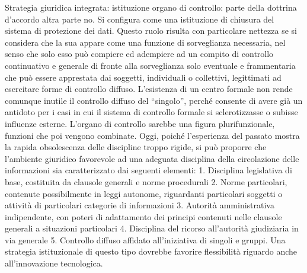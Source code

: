 Strategia giuridica integrata:
istituzione organo di controllo: parte della dottrina d’accordo altra parte no. Si configura come una istituzione di chiusura del sistema di protezione dei dati. Questo ruolo risulta con particolare nettezza se si considera che la sua appare come una funzione di sorveglianza necessaria, nel senso che solo esso può compiere ed adempiere ad un compito di controllo continuativo e generale di fronte alla sorveglianza solo eventuale e frammentaria che può essere apprestata dai soggetti, individuali o collettivi, legittimati ad esercitare forme di controllo diffuso. L’esistenza di un centro formale non rende comunque inutile il controllo diffuso del “singolo”, perché consente di avere già un antidoto per i casi in cui il sistema di controllo formale si sclerotizzasse o subisse influenze esterne. L’organo di controllo sarebbe una figura plurifunzionale, funzioni che poi vengono combinate.
Oggi, poiché l’esperienza del passato mostra la rapida obsolescenza delle discipline troppo rigide, si può proporre che l’ambiente giuridico favorevole ad una adeguata disciplina della circolazione delle informazioni sia caratterizzato dai seguenti elementi:
1.	Disciplina legislativa di base, costituita da clausole generali e norme procedurali
2.	Norme particolari, contenute possibilmente in leggi autonome, riguardanti particolari soggetti o attività di particolari categorie di informazioni
3.	Autorità amministrativa indipendente, con poteri di adattamento dei principi contenuti nelle clausole generali a situazioni particolari
4.	Disciplina del ricorso all’autorità giudiziaria in via generale
5.	Controllo diffuso affidato all’iniziativa di singoli e gruppi.
Una strategia istituzionale di questo tipo dovrebbe favorire flessibilità riguardo anche all’innovazione tecnologica.



